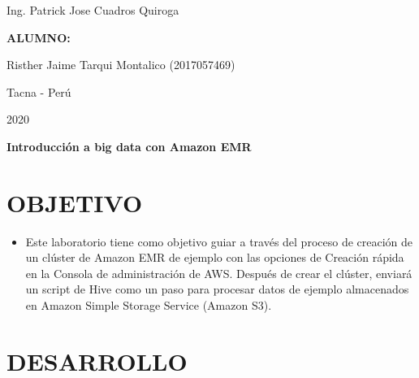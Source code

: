 \documentclass[12pt,letterpaper]{article}
\begin{document}
\begin{titlepage}
\begin{center}
\begin{Large}
			\end{Large}
			\vspace*{0.1in}
			\begin{large}
				Ing. Patrick Jose Cuadros Quiroga\\
			\end{large}
			\vspace*{0.3in}
			\begin{large}
				\textbf{ALUMNO:} \\
				\begin{flushleft}
					Risther Jaime Tarqui Montalico  		\hfill	(2017057469) \\
				\end{flushleft}
			\end{large}
			\vspace*{1.3in}
			\begin{large}
				Tacna - Perú\\
			\end{large}
			\vspace*{0.1in}
			\begin{large}
				2020\\
			\end{large}
		\end{center}
	\end{titlepage}
	
	\newpage
	
	\justify
	
	\begin{LARGE}
		\begin{center}
			\textbf{Introducción a big data con Amazon EMR} \\
		\end{center}
	\end{LARGE}
	\section{OBJETIVO}
	\begin{itemize}
		\item Este laboratorio tiene como objetivo guiar a través del proceso de creación de un clúster de Amazon EMR de ejemplo con las
		opciones de Creación rápida en la Consola de administración de AWS.
		Después de crear el clúster, enviará un script de Hive como un paso para procesar datos de ejemplo
		almacenados en Amazon Simple Storage Service (Amazon S3). 
	\end{itemize}
	
	\section{DESARROLLO}
\end{document}
